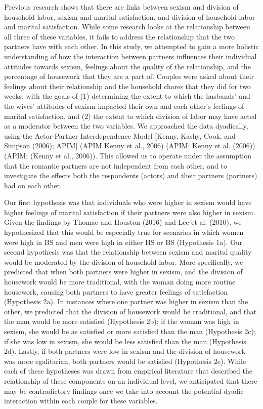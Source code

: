 \documentclass[
  man]{apa6}
\begin{document}
Previous research shows that there are links between sexism and division of household labor, sexism and marital satisfaction, and division of household labor and marital satisfaction. While some research looks at the relationship between all three of these variables, it fails to address the relationship that the two partners have with each other. In this study, we attempted to gain a more holistic understanding of how the interaction between partners influences their individual attitudes towards sexism, feelings about the quality of the relationship, and the percentage of housework that they are a part of. Couples were asked about their feelings about their relationship and the household chores that they did for two weeks, with the goals of (1) determining the extent to which the husbands' and the wives' attitudes of sexism impacted their own and each other's feelings of marital satisfaction, and (2) the extent to which division of labor may have acted as a moderator between the two variables. We approached the data dyadically, using the Actor-Partner Interdependence Model {[}Kenny, Kashy, Cook, and Simpson (2006); APIM{]} (APIM Kenny et al., 2006) (APIM; Kenny et al. (2006)) (APIM; (Kenny et al., 2006)). This allowed us to operate under the assumption that the romantic partners are not independent from each other, and to investigate the effects both the respondents (actors) and their partners (partners) had on each other.

Our first hypothesis was that individuals who were higher in sexism would have higher feelings of marital satisfaction if their partners were also higher in sexism. Given the findings by Thomae and Houston (2016) and Lee et al. (2010), we hypothesized that this would be especially true for scenarios in which women were high in BS and men were high in either HS or BS (Hypothesis 1a). Our second hypothesis was that the relationship between sexism and marital quality would be moderated by the division of household labor. More specifically, we predicted that when both partners were higher in sexism, and the division of housework would be more traditional, with the woman doing more routine housework, causing both partners to have greater feelings of satisfaction (Hypothesis 2a). In instances where one partner was higher in sexism than the other, we predicted that the division of housework would be traditional, and that the man would be more satisfied (Hypothesis 2b); if the woman was high in sexism, she would be as satisfied or more satisfied than the man (Hypothesis 2c); if she was low in sexism, she would be less satisfied than the man (Hypothesis 2d). Lastly, if both partners were low in sexism and the division of housework was more egalitarian, both partners would be satisfied (Hypothesis 2e). While each of these hypotheses was drawn from empirical literature that described the relationship of these components on an individual level, we anticipated that there may be contradictory findings once we take into account the potential dyadic interaction within each couple for these variables.
\end{document}
